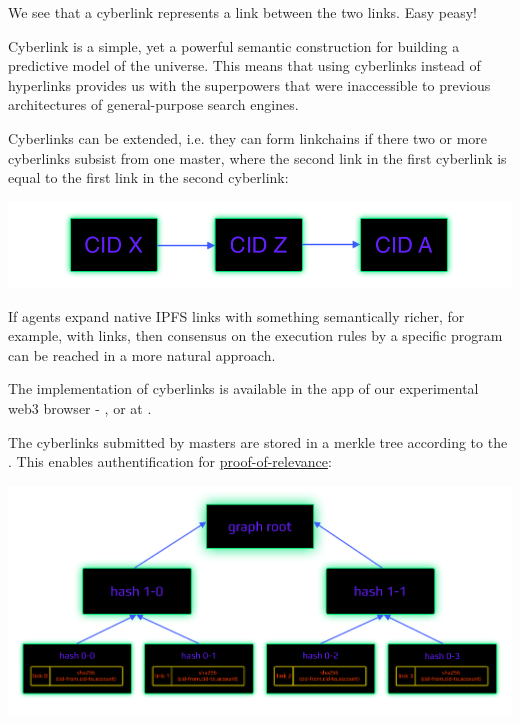 \documentclass[8pt,oneside]{amsart}
\newcommand{\linkred}[2]{\href{#1}{\color{red}{#2}}}
\newcommand{\linkgreen}[2]{\href{#1}{\color{green}{#2}}}
\newenvironment{Figure}
  {\par\medskip\noindent\minipage{\linewidth}}
  {\endminipage\par\medskip}
\begin{document}
We see that a cyberlink represents a link between the two links. Easy peasy!

Cyberlink is a simple, yet a powerful semantic construction for building a predictive model of the universe. This means that using cyberlinks instead of hyperlinks provides us with the superpowers that were inaccessible to previous architectures of general-purpose search engines.

Cyberlinks can be extended, i.e. they can form linkchains if there two or more cyberlinks subsist from one master, where the second link in the first cyberlink is equal to the first link in the second cyberlink:

\begin{Figure}
    \centering
    \includegraphics[width=1\textwidth]{linkchain.png}
\end{Figure}

If agents expand native IPFS links with something semantically richer, for example, with
\linkred{https://github.com/cybercongress/cyb/blob/dev/docs/dura.md}{dura}
links, then consensus on the execution rules by a specific program can be reached in a more natural approach.

The \linkred{https://github.com/cybercongress/go-cyber}{go-cyber} implementation of cyberlinks is available in the \linkred{https://github.com/cybercongress/dot-cyber}{.cyber} app of our experimental web3 browser - \linkred{https://cyb.ai}{cyb}, or at \linkred{http://cyber.page}{cyber.page}.

The cyberlinks submitted by masters are stored in a merkle tree according to the \linkgreen{https://ipfs.io/ipfs/QmZpJLmc3T2L1FLUxzvU3P8MBCPe15fEmUyVS7Bz8ZKMhG}{RFC-6962 standard}. This enables authentification for {\hyperref[proof-of-relevance]{proof-of-relevance}}:

\begin{Figure}
    \centering
    \includegraphics[width=1\textwidth]{graph-tree.png}
\end{Figure}
\end{document}
